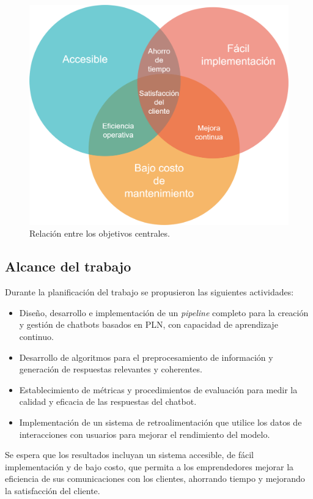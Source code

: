 \begin{figure}[htbp]

  \centering
  \includegraphics[width=.75\textwidth]{./Figures/Venn_objetivos.png}
  \caption{Relación entre los objetivos centrales.}
  \label{fig:objetivos_venn}
\end{figure}

\subsection{Alcance del trabajo}

Durante la planificación del trabajo se propusieron las siguientes actividades:

\begin{itemize}
    \item Diseño, desarrollo e implementación de un \textit{pipeline} completo para la creación y gestión de chatbots basados en PLN, con capacidad de aprendizaje continuo.
    \item Desarrollo de algoritmos para el preprocesamiento de información y generación de respuestas relevantes y coherentes.
    \item Establecimiento de métricas y procedimientos de evaluación para medir la calidad y eficacia de las respuestas del chatbot.
    \item Implementación de un sistema de retroalimentación que utilice los datos de interacciones con usuarios para mejorar el rendimiento del modelo.
\end{itemize}

Se espera que los resultados incluyan un sistema accesible, de fácil implementación y de bajo costo, que permita a los emprendedores mejorar la eficiencia de sus comunicaciones con los clientes, ahorrando tiempo y mejorando la satisfacción del cliente.



